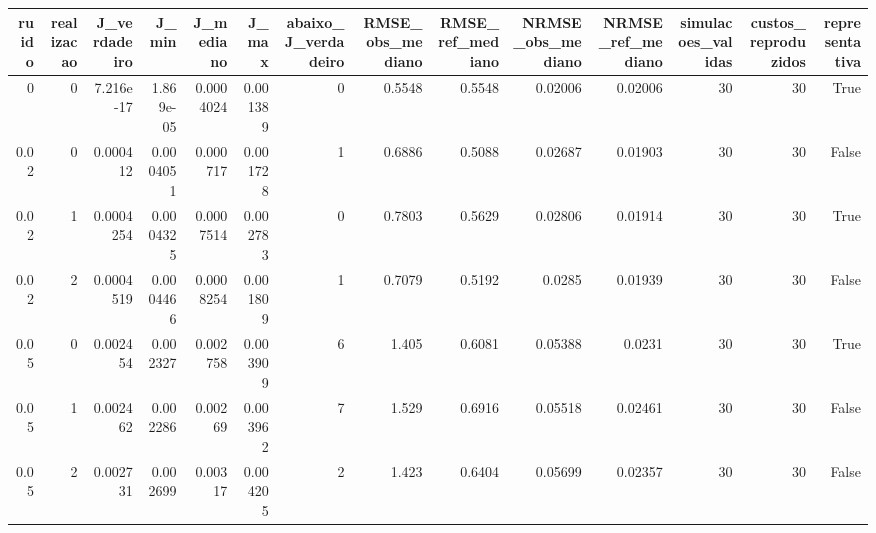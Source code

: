 \begin{tabular}{rrrrrrrrrrrrrr}
\toprule
ruido & realizacao & J\_verdadeiro & J\_min & J\_mediano & J\_max & abaixo\_J\_verdadeiro & RMSE\_obs\_mediano & RMSE\_ref\_mediano & NRMSE\_obs\_mediano & NRMSE\_ref\_mediano & simulacoes\_validas & custos\_reproduzidos & representativa \\
\midrule
0 & 0 & 7.216e-17 & 1.869e-05 & 0.0004024 & 0.001389 & 0 & 0.5548 & 0.5548 & 0.02006 & 0.02006 & 30 & 30 & True \\
0.02 & 0 & 0.000412 & 0.0004051 & 0.000717 & 0.001728 & 1 & 0.6886 & 0.5088 & 0.02687 & 0.01903 & 30 & 30 & False \\
0.02 & 1 & 0.0004254 & 0.0004325 & 0.0007514 & 0.002783 & 0 & 0.7803 & 0.5629 & 0.02806 & 0.01914 & 30 & 30 & True \\
0.02 & 2 & 0.0004519 & 0.0004466 & 0.0008254 & 0.001809 & 1 & 0.7079 & 0.5192 & 0.0285 & 0.01939 & 30 & 30 & False \\
0.05 & 0 & 0.002454 & 0.002327 & 0.002758 & 0.003909 & 6 & 1.405 & 0.6081 & 0.05388 & 0.0231 & 30 & 30 & True \\
0.05 & 1 & 0.002462 & 0.002286 & 0.00269 & 0.003962 & 7 & 1.529 & 0.6916 & 0.05518 & 0.02461 & 30 & 30 & False \\
0.05 & 2 & 0.002731 & 0.002699 & 0.00317 & 0.004205 & 2 & 1.423 & 0.6404 & 0.05699 & 0.02357 & 30 & 30 & False \\
\bottomrule
\end{tabular}

